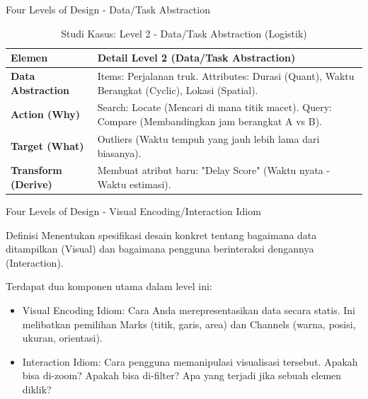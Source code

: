 \documentclass[t]{beamer}
\begin{document}
\begin{frame}{Four Levels of Design - Data/Task Abstraction}

	\begin{table}[h]
    \centering
    \small
    \caption{Studi Kasus: Level 2 - Data/Task Abstraction (Logistik)}
    \vspace{0.3cm}
    \begin{tabularx}{\textwidth}{@{} l >{\RaggedRight\arraybackslash}X @{}}
        \toprule
        \textbf{Elemen} & \textbf{Detail Level 2 (Data/Task Abstraction)} \\ 
        \midrule
        \textbf{Data Abstraction} & Items: Perjalanan truk. Attributes: Durasi (Quant), Waktu Berangkat (Cyclic), Lokasi (Spatial). \\ \addlinespace
        \textbf{Action (Why)} & Search: Locate (Mencari di mana titik macet). Query: Compare (Membandingkan jam berangkat A vs B). \\ \addlinespace
        \textbf{Target (What)} & Outliers (Waktu tempuh yang jauh lebih lama dari biasanya). \\ \addlinespace
        \textbf{Transform (Derive)} & Membuat atribut baru: "Delay Score" (Waktu nyata - Waktu estimasi). \\ 
        \bottomrule
    \end{tabularx}
	\end{table}


\end{frame}


\begin{frame}{Four Levels of Design - Visual Encoding/Interaction Idiom}
	\begin{block}{Definisi}
		Menentukan spesifikasi desain konkret tentang bagaimana data ditampilkan (Visual) dan bagaimana pengguna berinteraksi dengannya (Interaction).
	\end{block}
	Terdapat dua komponen utama dalam level ini:
	\begin{itemize}
		\item Visual Encoding Idiom: Cara Anda merepresentasikan data secara statis. Ini melibatkan pemilihan Marks (titik, garis, area) dan Channels (warna, posisi, ukuran, orientasi).
		
		\item Interaction Idiom: Cara pengguna memanipulasi visualisasi tersebut. Apakah bisa di-zoom? Apakah bisa di-filter? Apa yang terjadi jika sebuah elemen diklik?
	\end{itemize}
\end{frame}
\end{document}
